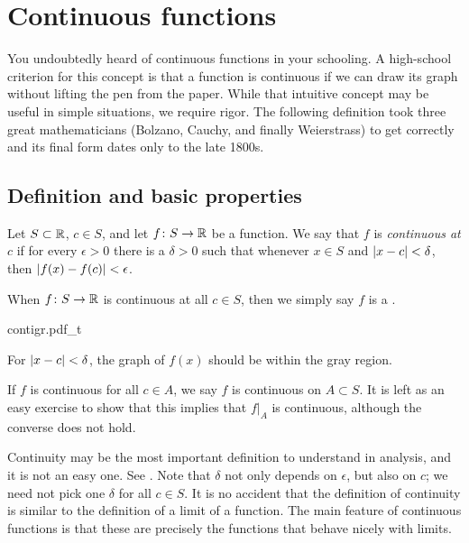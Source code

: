 
\sectionnewpage
\section{Continuous functions}
\label{sec:cont}


You undoubtedly heard of continuous functions in your schooling.  A
high-school criterion for this concept is that a function is continuous if
we can draw its graph without lifting the pen from the paper.  While that
intuitive concept may be useful in simple situations, we require
rigor.  The following definition took three great mathematicians
(Bolzano, Cauchy, and finally Weierstrass) to get correctly and its final
form dates only to the late 1800s.

\subsection{Definition and basic properties}

\begin{defn}
Let $S \subset {\mathbb{R}}$, $c \in S$, and let $f \colon S \to {\mathbb{R}}$ be a function.
We say
that $f$ is \emph{continuous at $c$}
if for every $\epsilon > 0$
there is a $\delta > 0$ such that whenever $x \in S$ and $\left\lvert {x-c} \right\rvert <
\delta$, then
$\left\lvert {f(x)-f(c)} \right\rvert < \epsilon$.


When $f \colon S \to {\mathbb{R}}$ is continuous at all $c \in S$, then we simply say
$f$ is a \emph{}.
\end{defn}
\begin{myfigureht}
{contigr.pdf_t}
\caption{For $\left\lvert {x-c} \right\rvert < \delta$, the graph of $f(x)$ should be within the gray region.\label{fig:contigr}}
\end{myfigureht}

If $f$ is continuous for all $c \in A$, we say
$f$ is continuous on $A \subset S$.  It is left as an easy exercise to
show that this implies that $f|_A$ is continuous, although
the converse does not hold.

Continuity may be the most important definition to understand in analysis,
and it is not an easy one.  See .
Note that $\delta$ not only
depends on $\epsilon$, but also on $c$;  we need not pick
one $\delta$ for all $c \in S$.
It is no accident 
that the definition of continuity is similar to the definition of a
limit of a function.  The main feature of continuous functions
is that these are precisely the functions that behave nicely with limits.

